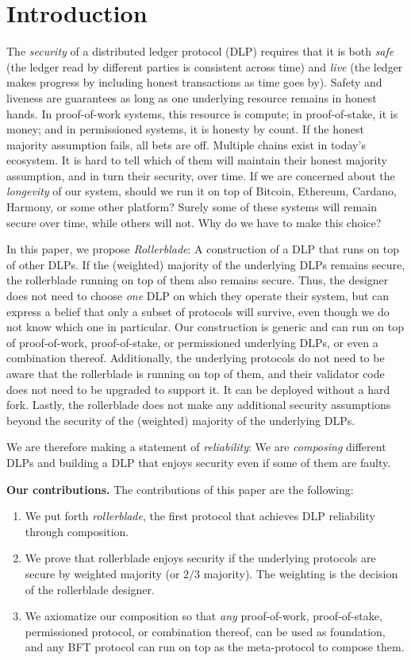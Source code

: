 \section{Introduction}
The \emph{security} of a distributed ledger protocol (DLP) requires that it is both \emph{safe} (the ledger
read by different parties is consistent across time) and \emph{live} (the ledger makes progress
by including honest transactions as time goes by). Safety and liveness are guarantees as
long as one underlying resource remains in honest hands. In proof-of-work systems, this
resource is compute; in proof-of-stake, it is money; and in permissioned systems, it is
honesty by count. If the honest majority assumption fails, all bets are off.
Multiple chains exist in today's ecosystem. It is hard to tell which of them will
maintain their honest majority assumption, and in turn their security, over time.
If we are concerned about the \emph{longevity} of our system, should we run it on top of
Bitcoin, Ethereum, Cardano, Harmony, or some other platform? Surely some of these
systems will remain secure over time, while others will not. Why do we have to make
this choice?

In this paper, we propose \emph{Rollerblade}: A construction of a DLP
that runs on top of other DLPs. If the (weighted)
majority of the underlying DLPs remains secure, the rollerblade running
on top of them also remains secure. Thus, the designer does not need to choose \emph{one}
DLP on which they operate their system, but can express a belief that only a subset of
protocols will survive, even though we do not know which one in particular. Our
construction is generic and can run on top of proof-of-work, proof-of-stake, or
permissioned underlying DLPs, or even a combination thereof.
Additionally, the underlying protocols do not need to be aware that the rollerblade
is running on top of them, and their validator code does not need to be upgraded
to support it. It can be deployed without a hard fork.
Lastly, the rollerblade does not make any additional security
assumptions beyond the security of the (weighted) majority of the underlying
DLPs.

We are therefore making a statement of \emph{reliability}: We are \emph{composing}
different DLPs and building a DLP that enjoys security even if some of them
are faulty.

\noindent
\textbf{Our contributions.} The contributions of this paper are the following:

\begin{enumerate}
  \item We put forth \emph{rollerblade}, the first protocol that achieves DLP
        reliability through composition.
  \item We prove that rollerblade enjoys security if the underlying protocols
        are secure by weighted majority (or $2/3$ majority).
        The weighting is the decision of the rollerblade designer.
  \item We axiomatize our composition so that \emph{any} proof-of-work, proof-of-stake,
        permissioned protocol, or combination thereof, can be used as foundation,
        and any BFT protocol can run on top as the meta-protocol to compose them.
\end{enumerate}

